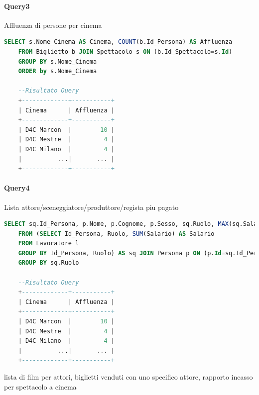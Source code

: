 \documentclass[10pt]{article}
\begin{document}
	\paragraph{Query3}
	Affluenza di persone per cinema
	\begin{lstlisting}[language=SQL]
	SELECT s.Nome_Cinema AS Cinema, COUNT(b.Id_Persona) AS Affluenza
	FROM Biglietto b JOIN Spettacolo s ON (b.Id_Spettacolo=s.Id)
	GROUP BY s.Nome_Cinema
	ORDER by s.Nome_Cinema
	
	--Risultato Query
	+-------------+-----------+
	| Cinema      | Affluenza |
	+-------------+-----------+
	| D4C Marcon  |        10 |
	| D4C Mestre  |         4 |
	| D4C Milano  |         4 |
	|          ...|       ... |
	+-------------+-----------+	
	\end{lstlisting}
	\paragraph{Query4}
	Lista attore/sceneggiatore/produttore/regista piu pagato
	\begin{lstlisting}[language=SQL]
	SELECT sq.Id_Persona, p.Nome, p.Cognome, p.Sesso, sq.Ruolo, MAX(sq.Salario) AS Salario
	FROM (SELECT Id_Persona, Ruolo, SUM(Salario) AS Salario
	FROM Lavoratore l
	GROUP BY Id_Persona, Ruolo) AS sq JOIN Persona p ON (p.Id=sq.Id_Persona)
	GROUP BY sq.Ruolo
	
	--Risultato Query
	+-------------+-----------+
	| Cinema      | Affluenza |
	+-------------+-----------+
	| D4C Marcon  |        10 |
	| D4C Mestre  |         4 |
	| D4C Milano  |         4 |
	|          ...|       ... |
	+-------------+-----------+	
	\end{lstlisting}
	 lista di film per attori, biglietti venduti con uno specifico attore, rapporto incasso per spettacolo a cinema
\end{document}
